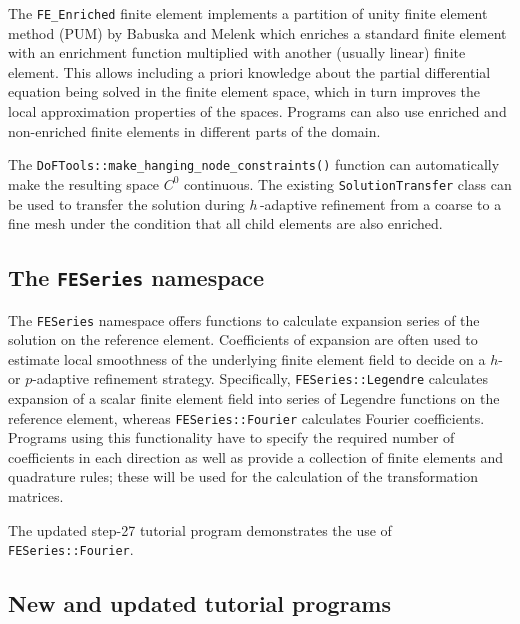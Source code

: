 \documentclass{ansarticle-preprint}
\begin{document}
The \verb!FE_Enriched! finite element implements a partition of unity
finite element method (PUM) by Babuska and Melenk which enriches a standard
finite element with an enrichment function multiplied with another (usually
linear) finite element. This allows including 
a priori knowledge about the partial differential equation being solved
in the finite element space,
which in turn improves the local approximation properties of the spaces.
Programs can also use enriched and non-enriched finite elements in
different parts of the domain.

The
\verb|DoFTools::make_hanging_node_constraints()| function can automatically
make the resulting space $C^0$ continuous. The existing \verb|SolutionTransfer|
class can be used to transfer the solution during $h$\,-adaptive refinement
from a coarse to a fine mesh under the condition that all child elements
are also enriched.

\subsection{The \texttt{FESeries} namespace}

The \verb|FESeries| namespace offers functions to calculate expansion
series of the solution on the reference element. Coefficients of expansion
are often used to estimate local smoothness of the underlying finite
element field to decide on a $h$- or $p$-adaptive refinement strategy.
Specifically, \verb|FESeries::Legendre| calculates expansion of a
scalar finite element
field into series of Legendre functions on the reference element, whereas
\verb|FESeries::Fourier| calculates Fourier coefficients. Programs
using this functionality have to
specify the required number of coefficients in each direction as well as
provide a collection of finite elements and quadrature rules; these will be
used for the calculation of the transformation matrices.

The updated step-27 tutorial program demonstrates the
use of \verb|FESeries::Fourier|.

\subsection{New and updated tutorial programs}
\end{document}
